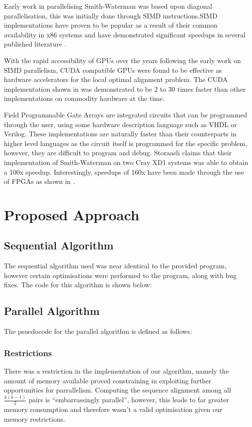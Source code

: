 \documentclass[manuscript,screen, nonacm=true]{acmart}
\begin{document}
Early work in parallelising Smith-Waterman was based upon diagonal parallelisation, this was initially done through SIMD instructions.SIMD implementations have proven to be popular as a result of their common availability in x86 systems and have demonstrated significant speedups in several published literature \cite{rognes2000six, zhao2013ssw}.  

With the rapid accessibility of GPUs over the years following the early work on SIMD parallelism, CUDA compatible GPUs were found to be effective as hardware accelerators for the local optimal alignment problem. The CUDA implementation shown in \cite{manavski2008cuda} was demonstrated to be 2 to 30 times faster than other implementations on commodity hardware at the time. 

Field Programmable Gate Arrays are integrated circuits that can be programmed through the user, using some hardware description language such as VHDL or Verilog. These implementations are naturally faster than their counterparts in higher level languages as the circuit itself is programmed for the specific problem, however, they are difficult to program and debug. Storaasli \cite{storaasli2007accelerating} claims that their implementation of Smith-Waterman on two Cray XD1 systems was able to obtain a 100x speedup. Interestingly, speedups of 160x have been made through the use of FPGAs as shown in \cite{li2007160}.

\section{Proposed Approach}


\subsection{Sequential Algorithm}
The sequential algorithm used was near identical to the provided program, however certain optimisations were performed to the program, along with bug fixes. The code for this algorithm is shown below:


\subsection{Parallel Algorithm}
The psuedocode for the parallel algorithm is defined as follows:


\clearpage 

\subsubsection{Restrictions}
There was a restriction in the implementation of our algorithm, namely the amount of memory available proved constraining in exploiting further opportunities for parrallelism. Computing the sequence alignment among all $\frac{k(k-1)}{2}$ pairs is ``embarrassingly parallel'', however, this leads to far greater memory consumption and therefore wasn't a valid optimisation given our memory restrictions. 
\end{document}
